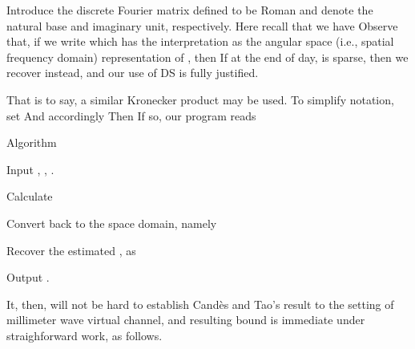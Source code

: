 \stopsubsection

\startsubsection [title={Expression for the Angular Space}]

Introduce the discrete Fourier matrix  defined to be
Roman  and  denote the natural base and imaginary unit, respectively.
Here recall that we have
Observe that, if we write
which has the interpretation as the angular space (i.e., spatial frequency domain) representation of , then
If at the end of day,  is sparse, then we recover  instead, and our use of DS is fully justified.

That is to say, a similar Kronecker product may be used.
To simplify notation, set
And accordingly
Then
If so, our program reads

\Result
{Algorithm}
{
\startitemize[n]
\item Input , , .
\item Calculate
\item Convert  back to the space domain, namely
\item Recover the estimated , as
\item Output .
\stopitemize
}

It, then, will not be hard to establish Cand\`es and Tao's result to the setting of millimeter wave virtual channel, and resulting bound is immediate under straighforward work, as follows.

\stopsubsection
\stopsection
\stopchapter
